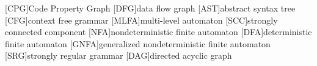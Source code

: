  
[CPG]{Code Property Graph}
[DFG]{data flow graph}
[AST]{abstract syntax tree}
[CFG]{context free grammar}
[MLFA]{multi-level automaton}
[SCC]{strongly connected component}
[NFA]{nondeterministic finite automaton}
[DFA]{deterministic finite automaton}
[GNFA]{generalized nondeterministic finite automaton}
[SRG]{strongly regular grammar}
[DAG]{directed acyclic graph}

